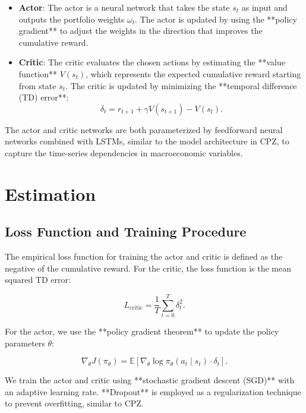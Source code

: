 \begin{itemize}
    \item \textbf{Actor}: The actor is a neural network that takes the state $s_t$ as input and outputs the portfolio weights $\omega_t$. The actor is updated by using the **policy gradient** to adjust the weights in the direction that improves the cumulative reward.
    \item \textbf{Critic}: The critic evaluates the chosen actions by estimating the **value function** $V(s_t)$, which represents the expected cumulative reward starting from state $s_t$. The critic is updated by minimizing the **temporal difference (TD) error**:
    \begin{equation}
        \delta_t = r_{t+1} + \gamma V(s_{t+1}) - V(s_t).
    \end{equation}
\end{itemize}

The actor and critic networks are both parameterized by feedforward neural networks combined with LSTMs, similar to the model architecture in CPZ, to capture the time-series dependencies in macroeconomic variables.

\section{Estimation}
\subsection{Loss Function and Training Procedure}
The empirical loss function for training the actor and critic is defined as the negative of the cumulative reward. For the critic, the loss function is the mean squared TD error:

\begin{equation}
    L_{\text{critic}} = \frac{1}{T} \sum_{t=0}^T \delta_t^2.
\end{equation}

For the actor, we use the **policy gradient theorem** to update the policy parameters $\theta$:

\begin{equation}
    \nabla_{\theta} J(\pi_\theta) = \mathbb{E}\left[ \nabla_{\theta} \log \pi_\theta(a_t \mid s_t) \cdot \delta_t \right].
\end{equation}

We train the actor and critic using **stochastic gradient descent (SGD)** with an adaptive learning rate. **Dropout** is employed as a regularization technique to prevent overfitting, similar to CPZ.

